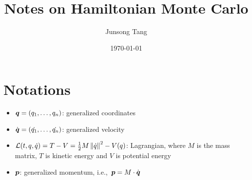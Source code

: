 \documentclass[hidelinks]{article}[12pt]
\title{\bf Notes on Hamiltonian Monte Carlo}
\author{Junsong Tang}
\date{\today}
\begin{document}
\maketitle

\section{Notations}
\begin{itemize}
    \item $\boldsymbol{q} = (q_1, \ldots, q_n)$: generalized coordinates
    \item $\dot{\boldsymbol{q}} = (\dot{q_1}, \ldots, \dot{q_n})$: generalized velocity
    \item ${\cal L}(t, q, \dot{q}) = T - V = \frac12 M \left\lVert\dot{q}\right\rVert^2 - V(q) $: Lagrangian, where $M$ is the mass matrix, $T$ is kinetic energy and $V$ is potential energy
    \item $\boldsymbol{p}$: generalized momentum, i.e.,\ $\boldsymbol{p} = M \cdot \dot{\boldsymbol{q}}$
\end{itemize}
\end{document}
